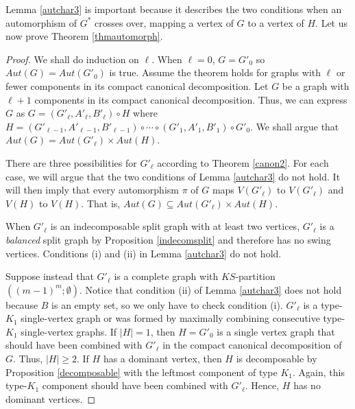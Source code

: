 \documentclass[11pt]{article}
\begin{document}
Lemma \ref{autchar3} is important because it describes the two conditions when an automorphism of $G^*$ crosses over, mapping a vertex of $G$ to a vertex of $H$.  Let us now prove Theorem \ref{thmautomorph}.

\begin{proof}
We shall do induction on $\ell$.  When $\ell = 0$,  $G = G'_0$ so $Aut(G) = Aut(G'_0)$ is true.  Assume the theorem holds for graphs with $\ell$ or fewer components in its compact canonical decomposition.  Let $G$ be a graph with $\ell + 1$ components in its compact canonical decomposition.  Thus, we can express $G$ as  $G =  (G'_\ell, A'_\ell, B'_\ell) \circ H$ where $H = (G'_{\ell-1}, A'_{\ell-1}, B'_{\ell-1}) \circ \cdots \circ (G'_1, A'_1, B'_1) \circ G'_0$.   We shall argue that $Aut(G) = Aut(G'_\ell) \times Aut(H)$.

There are three possibilities for $G'_\ell$ according to Theorem \ref{canon2}.  For each case, we will argue that the two conditions of Lemma \ref{autchar3} do not hold.  It will then imply that  every automorphism $\pi$ of $G$ maps $V(G'_\ell)$ to $V(G'_\ell)$ and $V(H)$ to $V(H)$.  That is, $Aut(G) \subseteq Aut(G'_\ell) \times Aut(H)$. 

 
When $G'_\ell$ is an indecomposable split graph with at least two vertices,  $G'_\ell$ is a {\it balanced} split graph by Proposition \ref{indecomsplit} and therefore has no swing vertices.  Conditions (i) and (ii) in Lemma \ref{autchar3} do not hold. 


Suppose instead that $G'_\ell$ is a complete graph with $KS$-partition $((m-1)^m; \emptyset)$.   Notice that condition (ii) of Lemma \ref{autchar3} does not hold because $B$ is an empty set, so we only have to check condition (i).  $G'_\ell$ is a type-$K_1$ single-vertex graph or was formed by maximally combining consecutive type-$K_1$ single-vertex graphs.   If $|H| = 1$,  then $H = G'_0$ is a single vertex graph that should have been combined with $G'_\ell$ in the compact canonical decomposition of $G$.  Thus, $|H| \ge 2$.  If $H$ has a dominant vertex, then $H$ is decomposable by Proposition \ref{decomposable} with the leftmost component of type $K_1$.  Again, this type-$K_1$ component should have been combined with $G'_\ell$.  Hence, $H$ has no dominant vertices.  


\end{proof}
\end{document}
